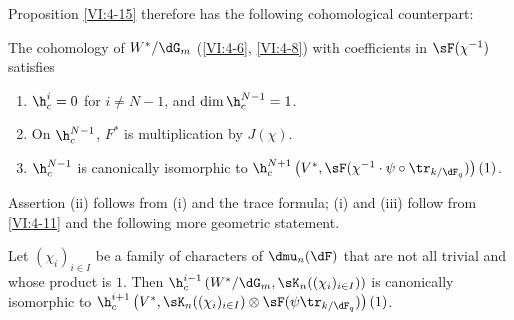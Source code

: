 Proposition \ref{VI:4-15} therefore has the following cohomological counterpart: 





\begin{proposition_}\label{VI:4-16}
The cohomology of $W^\ast/\dG_m$ (\ref{VI:4-6}, \ref{VI:4-8}) with coefficients 
in $\sF(\chi^{-1})$ satisfies 
\begin{enumerate}[\indent (i)]
  \item $\h_c^i=0$ for $i\ne N-1$, and $\dim \h_c^{N-1}{}=1$. 
  \item On $\h_c^{N-1}$, $F^\ast$ is multiplication by $J(\chi)$. 
  \item $\h_c^{N-1}$ is canonically isomorphic to 
    $\h_c^{N+1}\left(V^\ast,\sF(\chi^{-1}\cdot \psi\circ \tr_{k/\dF_q})\right)(1)$. 
\end{enumerate}
\end{proposition_}

Assertion (ii) follows from (i) and the trace formula; (i) and (iii) 
follow from \ref{VI:4-11} and the following more geometric statement. 





\begin{proposition_}\label{VI:4-17}
Let $(\chi_i)_{i\in I}$ be a family of characters of 
$\dmu_n(\dF)$ that are not all trivial and whose product is $1$. Then 
$\h_c^{i-1}\left(W^\ast/\dG_m,\sK_n((\chi_i)_{i\in I})\right)$ is 
canonically isomorphic to 
\newline
$\h_c^{i+1}\left(V^\ast,\sK_n((\chi_i)_{i\in I})\otimes \sF(\psi\tr_{k/\dF_q})\right)(1)$. 
\end{proposition_}

